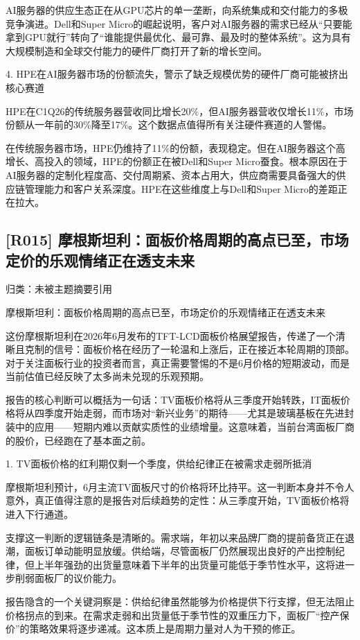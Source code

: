 \documentclass[11pt]{ctexart}
\begin{document}
AI服务器的供应生态正在从GPU芯片的单一垄断，向系统集成和交付能力的多极竞争演进。Dell和Super Micro的崛起说明，客户对AI服务器的需求已经从“只要能拿到GPU就行”转向了“谁能提供最优化、最可靠、最及时的整体系统”。这为具有大规模制造和全球交付能力的硬件厂商打开了新的增长空间。

4. HPE在AI服务器市场的份额流失，警示了缺乏规模优势的硬件厂商可能被挤出核心赛道

HPE在C1Q26的传统服务器营收同比增长20\%，但AI服务器营收仅增长11\%，市场份额从一年前的30\%降至17\%。这个数据点值得所有关注硬件赛道的人警惕。

在传统服务器市场，HPE仍维持了11\%的份额，表现稳定。但在AI服务器这个高增长、高投入的领域，HPE的份额正在被Dell和Super Micro蚕食。根本原因在于AI服务器的定制化程度高、交付周期紧、资本占用大，供应商需要具备强大的供应链管理能力和客户关系深度。HPE在这些维度上与Dell和Super Micro的差距正在拉大。

\subsection{[R015] 摩根斯坦利：面板价格周期的高点已至，市场定价的乐观情绪正在透支未来}
{\small\color{refgray}归类：未被主题摘要引用}

摩根斯坦利：面板价格周期的高点已至，市场定价的乐观情绪正在透支未来

这份摩根斯坦利在2026年6月发布的TFT-LCD面板价格展望报告，传递了一个清晰且克制的信号：面板价格在经历了一轮温和上涨后，正在接近本轮周期的顶部。对于关注面板行业的投资者而言，真正需要警惕的不是6月价格的短期波动，而是当前估值已经反映了太多尚未兑现的乐观预期。

报告的核心判断可以概括为一句话：TV面板价格将从三季度开始转跌，IT面板价格将从四季度开始走弱，而市场对“新兴业务”的期待——尤其是玻璃基板在先进封装中的应用——短期内难以贡献实质性的业绩增量。这意味着，当前台湾面板厂商的股价，已经跑在了基本面之前。

1. TV面板价格的红利期仅剩一个季度，供给纪律正在被需求走弱所抵消

摩根斯坦利预计，6月主流TV面板尺寸的价格将环比持平。这一判断本身并不令人意外，真正值得注意的是报告对后续趋势的定性：从三季度开始，TV面板价格将进入下行通道。

支撑这一判断的逻辑链条是清晰的。需求端，年初以来品牌厂商的提前备货正在退潮，面板订单动能明显放缓。供给端，尽管面板厂仍然展现出良好的产出控制纪律，但上半年强劲的出货量意味着下半年的出货量可能低于季节性水平，这将进一步削弱面板厂的议价能力。

报告隐含的一个关键洞察是：供给纪律虽然能够为价格提供下行支撑，但无法阻止价格拐点的到来。在需求走弱和出货量低于季节性的双重压力下，面板厂“控产保价”的策略效果将逐步递减。这本质上是周期力量对人为干预的修正。
\end{document}
